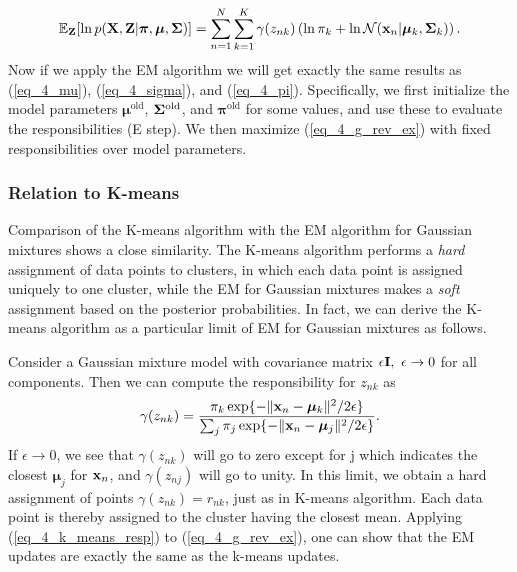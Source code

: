 \documentclass[../book-template.tex]{subfiles}
\begin{document}
\begin{equation}\label{eq_4_g_rev_ex}
	\mathbb{E}_{\bf Z}[\ln p({\bf X,Z}|\bm{\pi},\bm{\mu},{\bf \Sigma})] =  \sum_{n=1}^{N}\sum_{k=1}^{K} \gamma(z_{nk})\left(\ln \pi_k +\ln \mathcal{N}({\bf x}_n|\bm{\mu}_k,{\bf \Sigma}_k)\right).
\end{equation}
Now if we apply the EM algorithm we will get exactly the same results as (\ref{eq_4_mu}), (\ref{eq_4_sigma}), and (\ref{eq_4_pi}). Specifically, we first initialize the model parameters $\bm{\mu}^{\text{old}}$, ${\bf \Sigma}^{\text{old}}$, and $\bm{\pi}^{\text{old}}$ for some values, and use these to evaluate the responsibilities (E step). We then maximize (\ref{eq_4_g_rev_ex}) with fixed responsibilities over model parameters.
\subsubsection{Relation to K-means}
Comparison of the K-means algorithm with the EM algorithm for Gaussian mixtures shows a close similarity. The K-means algorithm performs a \emph{hard} assignment of data points to clusters, in which each data point is assigned uniquely to one cluster, while the EM for Gaussian mixtures makes a \emph{soft} assignment based on the posterior probabilities. In fact, we can derive the K-means algorithm as a particular limit of EM for Gaussian mixtures as follows.
\par Consider a Gaussian mixture model with covariance matrix $\epsilon {\bf I},\ \epsilon\rightarrow 0$ for all components. Then we can compute the responsibility for $z_{nk}$ as
\begin{equation}\label{eq_4_k_means_resp}
	\gamma(z_{nk}) = \frac{\pi_k \exp\{-\|{\bf x}_n - \bm{\mu}_k\|^2/2\epsilon\}}
	{\sum_j \pi_j \exp\{-\|{\bf x}_n - \bm{\mu}_j\|^2/2\epsilon\}}.
\end{equation}
If $\epsilon\rightarrow 0$, we see that $\gamma(z_{nk})$ will go to zero except for j which indicates the closest $\bm{\mu}_j$ for ${\bf x}_n$, and $\gamma(z_{nj})$ will go to unity. In this limit, we obtain a hard assignment of points $\gamma(z_{nk})=r_{nk}$, just as in K-means algorithm. Each data point is thereby assigned to the cluster having the closest mean. Applying (\ref{eq_4_k_means_resp}) to (\ref{eq_4_g_rev_ex}), one can show that the EM updates are exactly the same as the k-means updates.
\end{document}
